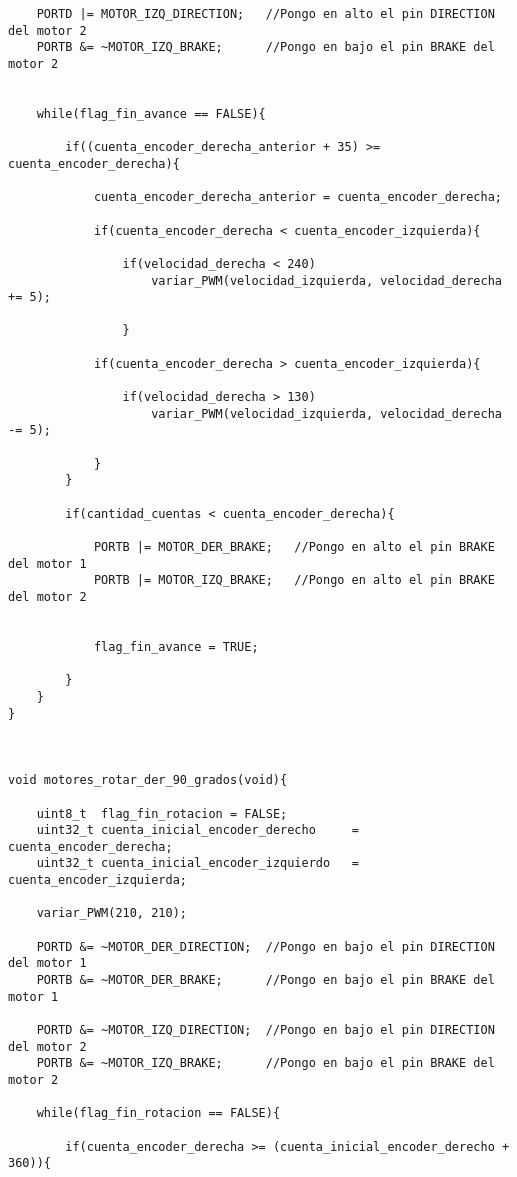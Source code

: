 \documentclass[a4paper,12pt]{article}   %
\begin{document}
\begin{lstlisting}
	PORTD |= MOTOR_IZQ_DIRECTION; 	//Pongo en alto el pin DIRECTION del motor 2
	PORTB &= ~MOTOR_IZQ_BRAKE;	    //Pongo en bajo el pin BRAKE del motor 2


    while(flag_fin_avance == FALSE){

        if((cuenta_encoder_derecha_anterior + 35) >= cuenta_encoder_derecha){

            cuenta_encoder_derecha_anterior = cuenta_encoder_derecha;

            if(cuenta_encoder_derecha < cuenta_encoder_izquierda){

                if(velocidad_derecha < 240)
                    variar_PWM(velocidad_izquierda, velocidad_derecha += 5);

                }

            if(cuenta_encoder_derecha > cuenta_encoder_izquierda){

                if(velocidad_derecha > 130)
                    variar_PWM(velocidad_izquierda, velocidad_derecha -= 5);

            }
        }

        if(cantidad_cuentas < cuenta_encoder_derecha){

            PORTB |= MOTOR_DER_BRAKE;	//Pongo en alto el pin BRAKE del motor 1
            PORTB |= MOTOR_IZQ_BRAKE;	//Pongo en alto el pin BRAKE del motor 2


            flag_fin_avance = TRUE;

        }
    }
}



void motores_rotar_der_90_grados(void){

    uint8_t  flag_fin_rotacion = FALSE;
    uint32_t cuenta_inicial_encoder_derecho     =   cuenta_encoder_derecha;
    uint32_t cuenta_inicial_encoder_izquierdo   =   cuenta_encoder_izquierda;

    variar_PWM(210, 210);

    PORTD &= ~MOTOR_DER_DIRECTION; 	//Pongo en bajo el pin DIRECTION del motor 1
    PORTB &= ~MOTOR_DER_BRAKE;	    //Pongo en bajo el pin BRAKE del motor 1

    PORTD &= ~MOTOR_IZQ_DIRECTION; 	//Pongo en bajo el pin DIRECTION del motor 2
    PORTB &= ~MOTOR_IZQ_BRAKE;	    //Pongo en bajo el pin BRAKE del motor 2

    while(flag_fin_rotacion == FALSE){

        if(cuenta_encoder_derecha >= (cuenta_inicial_encoder_derecho + 360)){


\end{lstlisting}
\end{document}
